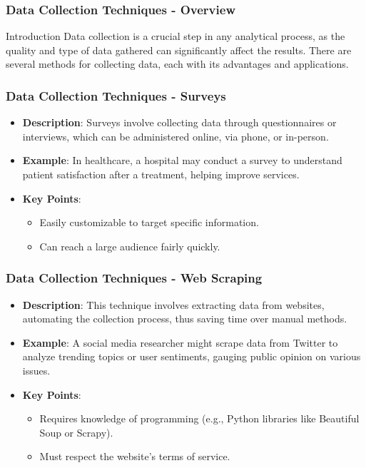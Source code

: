 \documentclass[aspectratio=169]{beamer}
\begin{document}
\begin{frame}[fragile]
    \frametitle{Data Collection Techniques - Overview}
    \begin{block}{Introduction}
        Data collection is a crucial step in any analytical process, as the quality and type of data gathered can significantly affect the results. There are several methods for collecting data, each with its advantages and applications.
    \end{block}
\end{frame}

\begin{frame}[fragile]
    \frametitle{Data Collection Techniques - Surveys}
    \begin{itemize}
        \item \textbf{Description}: Surveys involve collecting data through questionnaires or interviews, which can be administered online, via phone, or in-person.
        \item \textbf{Example}: In healthcare, a hospital may conduct a survey to understand patient satisfaction after a treatment, helping improve services.
        \item \textbf{Key Points}:
        \begin{itemize}
            \item Easily customizable to target specific information.
            \item Can reach a large audience fairly quickly.
        \end{itemize}
    \end{itemize}
\end{frame}

\begin{frame}[fragile]
    \frametitle{Data Collection Techniques - Web Scraping}
    \begin{itemize}
        \item \textbf{Description}: This technique involves extracting data from websites, automating the collection process, thus saving time over manual methods.
        \item \textbf{Example}: A social media researcher might scrape data from Twitter to analyze trending topics or user sentiments, gauging public opinion on various issues.
        \item \textbf{Key Points}:
        \begin{itemize}
            \item Requires knowledge of programming (e.g., Python libraries like Beautiful Soup or Scrapy).
            \item Must respect the website’s terms of service.
        \end{itemize}
    \end{itemize}
\end{frame}
\end{document}
